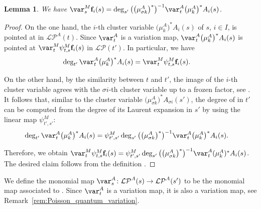 \documentclass[pdftex]{sigma}
\newcommand{\LP}{{\mathcal{LP}}}
\newcommand{\ff}{\mathbf{f}}
\numberwithin{equation}{section}
\newtheorem{Lemma}[Theorem]{Lemma}
\begin{document}
\begin{Lemma}\label{lem:deg_variation_change_A}
 We have $\var_{s}^{M}\ff_{i}(s)=\deg_{s'}\big(\big(\mu_{\sigma k}^{A}\big)^{*}\big)^{-1}\var_{t}^{A}\big(\mu_{k}^{A}\big)^{*}A_{i}(s)$.
 \end{Lemma}

 \begin{proof}
 On the one hand, the $i$-th cluster variable $\big(\mu_{k}^{A}\big)^{*}A_{i}(s)$
 of $s$, $i\in I$, is pointed at \smash{$\deg_{t}\big(\mu_{k}^{A}\big)^{*}A_{i}(s)=\psi_{t,s}^{M}\ff_{i}(s)$}
 in $\LP^{A}(t)$. Since $\var_{t}^{A}$ is a variation map, $\var_{t}^{A}\big(\mu_{k}^{A}\big)^{*}A_{i}(s)$
 is pointed at $\var_{t}^{M}\psi_{t,s}^{M}\ff_{i}(s)$ in $\LP(t')$.
 In particular, we have
 \begin{align*}
 \deg_{t'}\var_{t}^{A}\big(\mu_{k}^{A}\big)^{*}A_{i}(s) & =\var_{t}^{M}\psi_{t,s}^{M}\ff_{i}(s).
 \end{align*}

 On the other hand, by the similarity between $t$ and $t'$, the image
  of the $i$-th cluster variable
  agrees with the $\sigma i$-th cluster
 variable  up to a frozen
 factor, see \cite[Lemma 4.2.2]{qin2017triangular}. It follows that,
 similar to the cluster variable $\big(\mu_{\sigma k}^{A}\big)^{*}A_{\sigma i}(s')$,
 the degree of  in $t'$ can
 be computed from the degree of its Laurent expansion 
 in $s'$ by using the linear map $\psi_{t',s'}^{M}$:
 \begin{align*}
 \deg_{t'}\var_{t}^{A}\big(\mu_{k}^{A}\big)^{*}A_{i}(s) & =\psi_{t',s'}^{M}\deg_{s'}\big(\big(\mu_{\sigma k}^{A}\big)^{*}\big)^{-1}\var_{t}^{A}\big(\mu_{k}^{A}\big)^{*}A_{i}(s).
 \end{align*}

 Therefore, we obtain $\var_{t}^{M}\psi_{t,s}^{M}\ff_{i}(s)=\psi_{t',s'}^{M}\deg_{s'}\big(\big(\mu_{\sigma k}^{A}\big)^{*}\big)^{-1}\var_{t}^{A}(\mu_{k}^{A})^{*}A_{i}(s)$.
 The desired claim follows from the definition .
 \end{proof}

 We define the monomial map $\var_{s}^{A}\colon\LP^{A}(s)\rightarrow\LP^{A}(s')$ to be the monomial map associated to . Since $\var_{t}^A$ is a variation map, it is also a variation map, see Remark~\ref{rem:Poisson_quantum_variation}.
\end{document}
